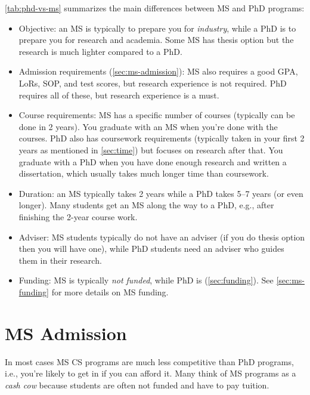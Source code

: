 \documentclass[oneside,11pt,dvipsnames]{book}
\begin{document}
\autoref{tab:phd-vs-ms} summarizes the main differences between MS and PhD programs:
\begin{itemize}

  \item Objective: an MS is typically to prepare you for \emph{industry}, while a PhD is to prepare you for research and academia. Some MS has thesis option but the research is much lighter compared to a PhD.

  \item Admission requirements (\autoref{sec:ms-admission}): MS also requires a good GPA, LoRs, SOP, and test scores, but research experience is not required.  PhD requires all of these, but research experience is a must.
  
  \item Course requirements: MS has a specific number of courses (typically can be done in 2 years). You graduate with an MS when you're done with the courses. PhD also has coursework requirements (typically taken in your first 2 years as mentioned in \autoref{sec:time}) but focuses on research after that.  You graduate with a PhD when you have done enough research and written a dissertation, which usually takes much longer time than coursework.
  
  \item Duration: an MS typically takes 2 years while a PhD takes 5--7 years (or even longer).  Many students get an MS along the way to a PhD, e.g., after finishing the 2-year course work.
  
  \item Adviser: MS students typically do not have an adviser (if you do thesis option then you will have one), while PhD students need an adviser who guides them in their research.
  
  \item Funding: MS is typically \emph{not funded}, while PhD is (\autoref{sec:funding}). See \autoref{sec:ms-funding} for more details on MS funding.
  
\end{itemize}

\section{MS Admission}\label{sec:ms-admission}

In most cases MS CS programs are much less competitive than PhD programs, i.e., you're likely to get in if you can afford it. Many think of MS programs as a \emph{cash cow} because students are often not funded and have to pay tuition. 
\end{document}
